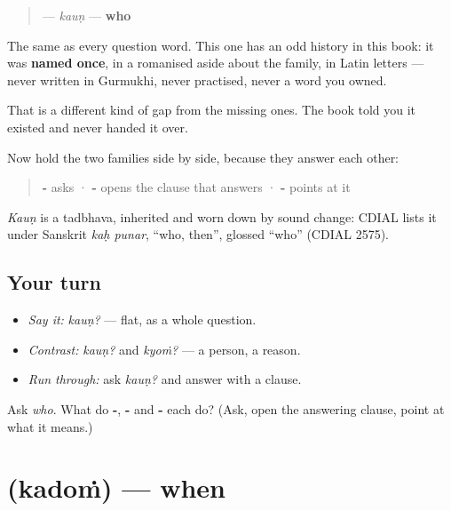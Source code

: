 \begin{cousinweb}
\begin{quote}
\textbf{} — \emph{kauṇ} — \textbf{who}
\end{quote}

The same \textbf{} as every question word. This one has an odd history in this book: it was \textbf{named once}, in a romanised aside about the family, in Latin letters — never written in Gurmukhi, never practised, never a word you owned.

That is a different kind of gap from the missing ones. The book told you it existed and never handed it over.

Now hold the two families side by side, because they answer each other:

\begin{quote}
\textbf{-} asks · \textbf{-} opens the clause that answers · \textbf{-} points at it
\end{quote}

\emph{Kauṇ} is a tadbhava, inherited and worn down by sound change: CDIAL lists it under Sanskrit \emph{kaḥ punar}, \textquotedblleft{}who, then\textquotedblright{}, glossed \textquotedblleft{}who\textquotedblright{} (CDIAL 2575).
\end{cousinweb}

\subsection*{Your turn}
\begin{itemize}
\raggedright
  \item \emph{Say it:} \emph{kauṇ?} — flat, as a whole question.
  \item \emph{Contrast:} \emph{kauṇ?} and \emph{kyoṁ?} — a person, a reason.
  \item \emph{Run through:} ask \emph{kauṇ?} and answer with a \textbf{} clause.
\end{itemize}

\begin{tcolorbox}[breakable,colback=teal!4,colframe=teal!35!black,title={Before you move on}]
Ask \emph{who}. What do \textbf{-}, \textbf{-} and \textbf{-} each do? (Ask, open the answering clause, point at what it means.)
\end{tcolorbox}
\section[\texorpdfstring{\pa{ਕਦੋਂ} (kadoṁ)}{ਕਦੋਂ (kadoṁ)}]{ (kadoṁ) — when}

